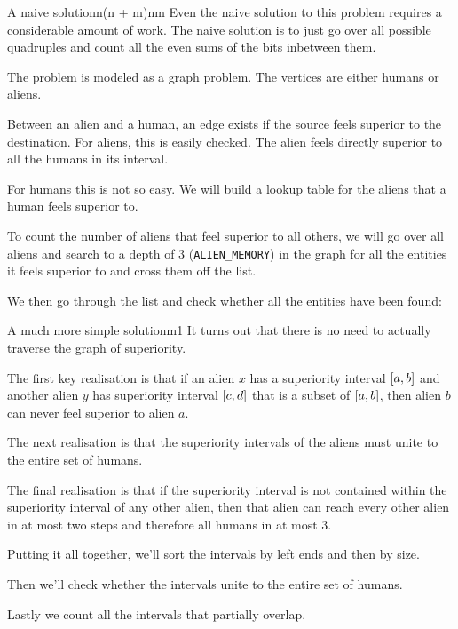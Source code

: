 \documentclass{writeup}
\begin{document}
\begin{solutions}
  \begin{solution}{A naive solution}{n(n + m)}{nm}
    Even the naive solution to this problem requires a considerable amount of work.
    The naive solution is to just go over all possible quadruples and count all the even sums of the bits inbetween them.

    The problem is modeled as a graph problem.
    The vertices are either humans or aliens.


    Between an alien and a human, an edge exists if the source feels superior to the destination.
    For aliens, this is easily checked.
    The alien feels directly superior to all the humans in its interval.


    For humans this is not so easy.
    We will build a lookup table for the aliens that a human feels superior to.


    To count the number of aliens that feel superior to all others, we will go over all aliens and search to a depth of $3$ (\texttt{ALIEN_MEMORY}) in the graph for all the entities it feels superior to and cross them off the list.


    We then go through the list and check whether all the entities have been found:

  \end{solution}

  \begin{solution}{A much more simple solution}{m}{1}
    It turns out that there is no need to actually traverse the graph of superiority.

    The first key realisation is that if an alien $x$ has a superiority interval $\interval{a}{b}$ and another alien $y$ has superiority interval $\interval{c}{d}$ that is a subset of $\interval{a}{b}$, then alien $b$ can never feel superior to alien $a$.

    The next realisation is that the superiority intervals of the aliens must unite to the entire set of humans.
    
    The final realisation is that if the superiority interval is not contained within the superiority interval of any other alien, then that alien can reach every other alien in at most two steps and therefore all humans in at most 3.

    Putting it all together, we'll sort the intervals by left ends and then by size.



    Then we'll check whether the intervals unite to the entire set of humans.


    Lastly we count all the intervals that partially overlap.

  \end{solution}
\end{solutions}
\end{document}
